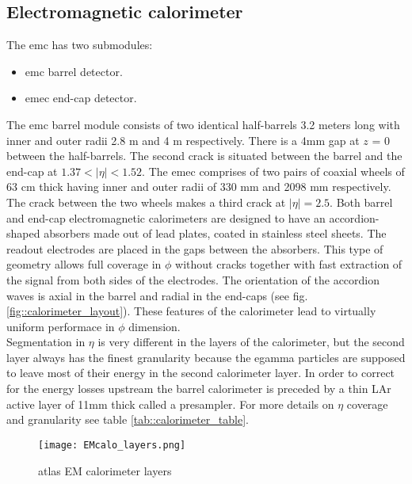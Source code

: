 	
	
        \subsection{Electromagnetic calorimeter }
        \label{emc}
        The \gls{emc} has two submodules:
        \begin{itemize}
        	\item \gls{emc} barrel detector.
        	\item \gls{emec} end-cap detector.
        \end{itemize}
        The \gls{emc} barrel module consists of two identical half-barrels 3.2 meters long with inner and outer radii 2.8 m and 4 m respectively. There is a 4mm gap at $z$ = 0 between the half-barrels. The second crack is situated between the barrel and the end-cap at $1.37 < |\eta| < 1.52$. The \gls{emec} comprises of two pairs of coaxial wheels of 63 cm thick having inner and outer radii of 330 mm and 2098 mm respectively. The crack between the two wheels makes a third crack at  $|\eta| = 2.5$.
        Both barrel and end-cap electromagnetic calorimeters are designed to have an accordion-shaped absorbers made out of lead plates, coated in stainless steel sheets. The readout electrodes are placed in the gaps between the absorbers. This type of geometry allows full coverage in $\phi$ without cracks together with fast extraction of the signal from both sides of the electrodes. The orientation of the accordion waves is axial in the barrel and radial in the end-caps (see fig. \ref{fig::calorimeter_layout}). These features of the calorimeter lead to virtually uniform performace in $\phi$ dimension. \\
        Segmentation in $\eta$  is very different in the layers of the calorimeter, but the second layer always has the finest granularity because the egamma particles are supposed to leave most of their energy in the second calorimeter layer. In order to correct for the energy losses upstream the barrel calorimeter is preceded by a thin LAr active layer of  11mm thick called a presampler. For more details on $\eta$ coverage and granularity see table \ref{tab::calorimeter_table}.

        \begin{figure}[htpb]
        	\texttt{[image: EMcalo\_layers.png]}
        	\caption{ \gls{atlas} EM calorimeter layers}
        	\label{fig::calorimeter_layers}
        \end{figure}
    
